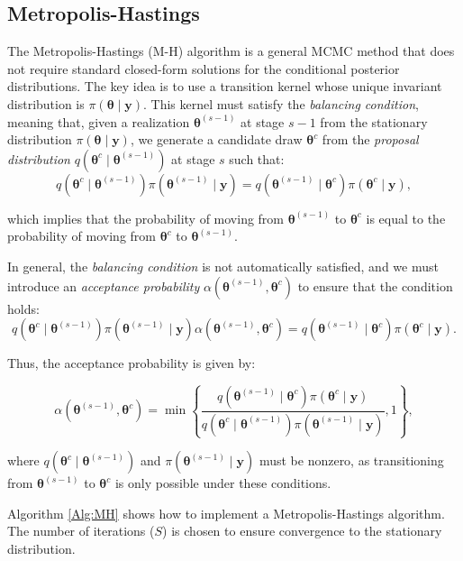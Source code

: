 \subsection{Metropolis-Hastings}\label{sec512}

The Metropolis-Hastings (M-H) algorithm \cite{metropolis53,hastings70} is a general MCMC method that does not require standard closed-form solutions for the conditional posterior distributions. The key idea is to use a transition kernel whose unique invariant distribution is $\pi(\bm{\theta} \mid  \bm{y})$. This kernel must satisfy the \textit{balancing condition}, meaning that, given a realization $\bm{\theta}^{(s-1)}$ at stage $s-1$ from the stationary distribution $\pi(\bm{\theta} \mid  \bm{y})$, we generate a candidate draw $\bm{\theta}^{c}$ from the \textit{proposal distribution} $q(\bm{\theta}^{c} \mid  \bm{\theta}^{(s-1)})$ at stage $s$ such that:
\[
q(\bm{\theta}^{c} \mid  \bm{\theta}^{(s-1)}) \pi(\bm{\theta}^{(s-1)} \mid  \bm{y}) = q(\bm{\theta}^{(s-1)} \mid  \bm{\theta}^{c}) \pi(\bm{\theta}^{c} \mid  \bm{y}),
\]

which implies that the probability of moving from $\bm{\theta}^{(s-1)}$ to $\bm{\theta}^{c}$ is equal to the probability of moving from $\bm{\theta}^{c}$ to $\bm{\theta}^{(s-1)}$.

In general, the \textit{balancing condition} is not automatically satisfied, and we must introduce an \textit{acceptance probability} $\alpha(\bm{\theta}^{(s-1)}, \bm{\theta}^{c})$ to ensure that the condition holds:
\[
q(\bm{\theta}^{c} \mid  \bm{\theta}^{(s-1)}) \pi(\bm{\theta}^{(s-1)} \mid  \bm{y}) \alpha(\bm{\theta}^{(s-1)}, \bm{\theta}^{c}) = q(\bm{\theta}^{(s-1)} \mid  \bm{\theta}^{c}) \pi(\bm{\theta}^{c} \mid  \bm{y}).
\]

Thus, the acceptance probability is given by:

\[
\alpha(\bm{\theta}^{(s-1)}, \bm{\theta}^{c}) = 
\min\left\{\frac{q(\bm{\theta}^{(s-1)} \mid  \bm{\theta}^{c}) \pi(\bm{\theta}^{c} \mid  \bm{y})}{q(\bm{\theta}^{c} \mid  \bm{\theta}^{(s-1)}) \pi(\bm{\theta}^{(s-1)} \mid  \bm{y})}, 1\right\},
\]

where $q(\bm{\theta}^{c} \mid  \bm{\theta}^{(s-1)})$ and $\pi(\bm{\theta}^{(s-1)} \mid  \bm{y})$ must be nonzero, as transitioning from $\bm{\theta}^{(s-1)}$ to $\bm{\theta}^{c}$ is only possible under these conditions.

Algorithm \ref{Alg:MH} shows how to implement a Metropolis-Hastings algorithm.  The number of iterations ($S$) is chosen to ensure convergence to the stationary distribution. 

